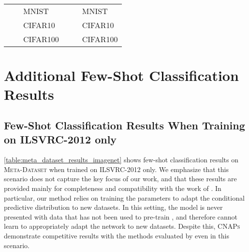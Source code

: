 \documentclass{article}
\theoremstyle{definition}
\newcommand{\cnaps}{\textsc{CNAPs}}
\begin{document}
\begin{table}[h]
\begin{tabular}{lll|lll}
               &        & MNIST   \citep{lecun2010mnist}   &            &               & MNIST \citep{lecun2010mnist} \\
               &        & CIFAR10  \cite{krizhevsky2009learning}  &            &               & CIFAR10 \cite{krizhevsky2009learning} \\
               &        & CIFAR100 \cite{krizhevsky2009learning}  &            &               & CIFAR100 \cite{krizhevsky2009learning} \\        \bottomrule
	\end{tabular}
    \vspace{2mm}
\end{table}



\section{Additional Few-Shot Classification Results}
\label{app:additional_results}

\subsection{Few-Shot Classification Results When Training on ILSVRC-2012 only}
\label{app:meta_dataset_imagenet}

\cref{table:meta_dataset_results_imagenet} shows few-shot classification results on \textsc{Meta-Dataset} when trained on ILSVRC-2012 only. We emphasize that this scenario does not capture the key focus of our work, and that these results are provided mainly for completeness and compatibility with the work of \citet{triantafillou2019meta}. In particular, our method relies on training the parameters  to adapt the conditional predictive distribution to new datasets. In this setting, the model is never presented with data that has not been used to pre-train , and therefore cannot learn to appropriately adapt the network to new datasets. Despite this, \cnaps{} demonstrate competitive results with the methods evaluated by \citet{triantafillou2019meta} even in this scenario.
\end{document}
